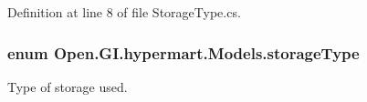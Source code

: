 Definition at line 8 of file Storage\+Type.\+cs.

\hypertarget{namespace_open_1_1_g_i_1_1hypermart_1_1_models_a21c5ffa7da75ad8a6d2b04798113f9db}{}
\subsubsection[{storage\+Type}]{\setlength{\rightskip}{0pt plus 5cm}enum {\bf Open.\+G\+I.\+hypermart.\+Models.\+storage\+Type}\hspace{0.3cm}{\ttfamily [strong]}}\label{namespace_open_1_1_g_i_1_1hypermart_1_1_models_a21c5ffa7da75ad8a6d2b04798113f9db}


Type of storage used. 

